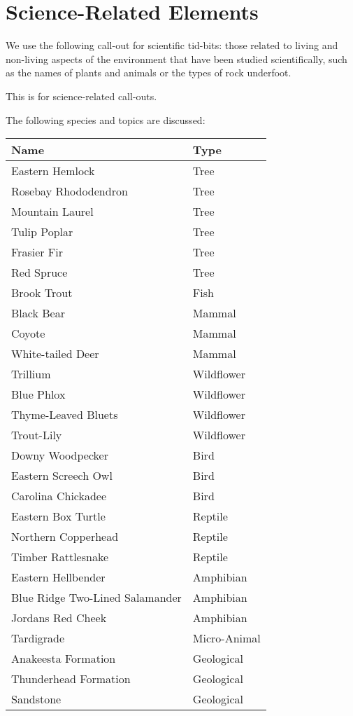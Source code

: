\documentclass[
]{book}
\begin{document}
\hypertarget{science-related-elements}{%
\section*{Science-Related Elements}\label{science-related-elements}}

We use the following call-out for scientific tid-bits: those related to living and non-living aspects of the environment that have been studied scientifically, such as the names of plants and animals or the types of rock underfoot.

\begin{rmdscience}
This is for science-related call-outs.
\end{rmdscience}

The following species and topics are discussed:

\begin{table}
\centering
\begin{tabular}[t]{l|l}
\hline
Name & Type\\
\hline
Eastern Hemlock & Tree\\
\hline
Rosebay Rhododendron & Tree\\
\hline
Mountain Laurel & Tree\\
\hline
Tulip Poplar & Tree\\
\hline
Frasier Fir & Tree\\
\hline
Red Spruce & Tree\\
\hline
Brook Trout & Fish\\
\hline
Black Bear & Mammal\\
\hline
Coyote & Mammal\\
\hline
White-tailed Deer & Mammal\\
\hline
Trillium & Wildflower\\
\hline
Blue Phlox & Wildflower\\
\hline
Thyme-Leaved Bluets & Wildflower\\
\hline
Trout-Lily & Wildflower\\
\hline
Downy Woodpecker & Bird\\
\hline
Eastern Screech Owl & Bird\\
\hline
Carolina Chickadee & Bird\\
\hline
Eastern Box Turtle & Reptile\\
\hline
Northern Copperhead & Reptile\\
\hline
Timber Rattlesnake & Reptile\\
\hline
Eastern Hellbender & Amphibian\\
\hline
Blue Ridge Two-Lined Salamander & Amphibian\\
\hline
Jordans Red Cheek & Amphibian\\
\hline
Tardigrade & Micro-Animal\\
\hline
Anakeesta Formation & Geological\\
\hline
Thunderhead Formation & Geological\\
\hline
Sandstone & Geological\\
\hline
\end{tabular}
\end{table}
\end{document}
